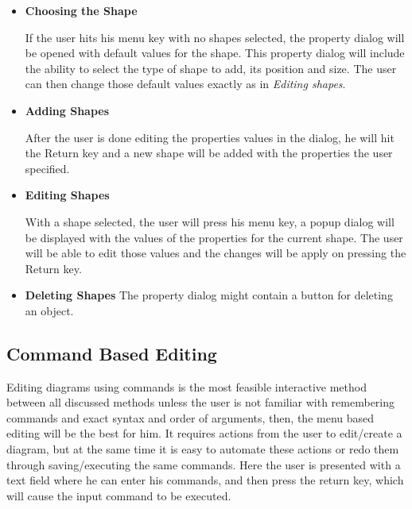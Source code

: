 \begin{itemize}
	\begin{itemize}
	\item {\bf Choosing the Shape}
	\par \noindent
	If the user hits his menu key with no shapes selected, the property dialog will be opened with default values for the shape. This property dialog will include the ability to select the type of shape to add, its position and size. The user can then change those default values exactly as in {\it Editing shapes}.

	\item {\bf Adding Shapes}
	\par \noindent
	After the user is done editing the properties values in the dialog, he will hit the Return key and a new shape will be added with the properties the user specified.

	\item {\bf Editing Shapes}
	\par \noindent
	With a shape selected, the user will press his menu key, a popup dialog will be displayed with the values of the properties for the current shape. The user will be able to edit those values and the changes will be apply on pressing the Return key.

	\item {\bf Deleting Shapes}
	The property dialog might contain a button for deleting an object.

	\end{itemize}

\end{itemize}

\subsection{Command Based Editing}
Editing diagrams using commands is the most feasible interactive method between all discussed methods unless the user is not familiar with remembering commands and exact syntax and order of arguments, then, the menu based editing will be the best for him. It requires actions from the user to edit/create a diagram, but at the same time it is easy to automate these actions or redo them through saving/executing the same commands. Here the user is presented with a text field where he can enter his commands, and then press the return key, which will cause the input command to be executed.

